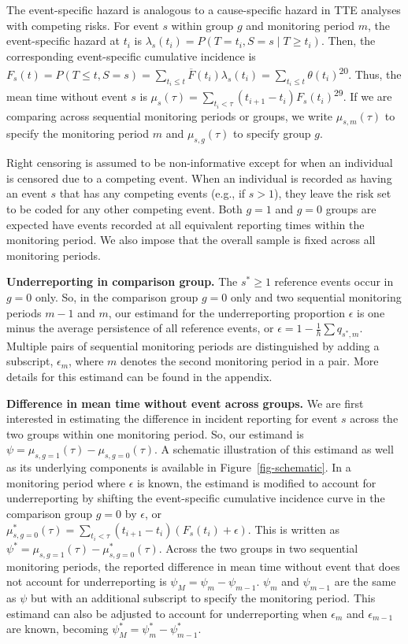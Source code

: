 \documentclass[
  12pt,
  number]{elsarticle}
\begin{document}
The event-specific hazard is analogous to a cause-specific hazard in TTE
analyses with competing risks. For event \(s\) within group \(g\) and
monitoring period \(m\), the event-specific hazard at \(t_i\) is
\(\lambda_s (t_i) = P(T = t_i, S = s \mid T \ge t_i)\). Then, the
corresponding event-specific cumulative incidence is
\(F_s(t) = P(T \le t, S = s) = \sum_{t_i \le t} \overline{F}(t_i)\lambda_s(t_i) = \sum_{t_i \le t} \theta (t_i)\)\textsuperscript{20}.
Thus, the mean time without event \(s\) is
\(\mu_s(\tau) = \sum_{t_i < \tau} (t_{i+1} - t_i)F_s(t_i)\)\textsuperscript{29}.
If we are comparing across sequential monitoring periods or groups, we
write \(\mu_{s,m}(\tau)\) to specify the monitoring period \(m\) and
\(\mu_{s,g}(\tau)\) to specify group \(g\).

Right censoring is assumed to be non-informative except for when an
individual is censored due to a competing event. When an individual is
recorded as having an event \(s\) that has any competing events (e.g.,
if \(s > 1\)), they leave the risk set to be coded for any other
competing event. Both \(g=1\) and \(g=0\) groups are expected have
events recorded at all equivalent reporting times within the monitoring
period. We also impose that the overall sample is fixed across all
monitoring periods.

\textbf{Underreporting in comparison group.} The \(s^* \ge 1\) reference
events occur in \(g=0\) only. So, in the comparison group \(g=0\) only
and two sequential monitoring periods \(m-1\) and \(m\), our estimand
for the underreporting proportion \(\epsilon\) is one minus the average
persistence of all reference events, or
\(\epsilon = 1 - \frac{1}{h} \sum q_{s^*,m}\). Multiple pairs of
sequential monitoring periods are distinguished by adding a subscript,
\(\epsilon_m\), where \(m\) denotes the second monitoring period in a
pair. More details for this estimand can be found in the appendix.

\textbf{Difference in mean time without event across groups.} We are
first interested in estimating the difference in incident reporting for
event \(s\) across the two groups within one monitoring period. So, our
estimand is \(\psi = \mu_{s,g=1}(\tau) - \mu_{s,g=0}(\tau)\). A
schematic illustration of this estimand as well as its underlying
components is available in Figure~\ref{fig-schematic}. In a monitoring
period where \(\epsilon\) is known, the estimand is modified to account
for underreporting by shifting the event-specific cumulative incidence
curve in the comparison group \(g=0\) by \(\epsilon\), or
\(\mu^*_{s,g=0}(\tau) = \sum_{t_i < \tau} (t_{i+1} - t_i)(F_s(t_i) + \epsilon)\).
This is written as \(\psi^* = \mu_{s,g=1}(\tau) - \mu^*_{s,g=0}(\tau)\).
Across the two groups in two sequential monitoring periods, the reported
difference in mean time without event that does not account for
underreporting is \(\psi_{M} = \psi_m - \psi_{m-1}\). \(\psi_m\) and
\(\psi_{m-1}\) are the same as \(\psi\) but with an additional subscript
to specify the monitoring period. This estimand can also be adjusted to
account for underreporting when \(\epsilon_m\) and \(\epsilon_{m-1}\)
are known, becoming \(\psi_M^* = \psi^*_m - \psi^*_{m-1}\).
\end{document}

